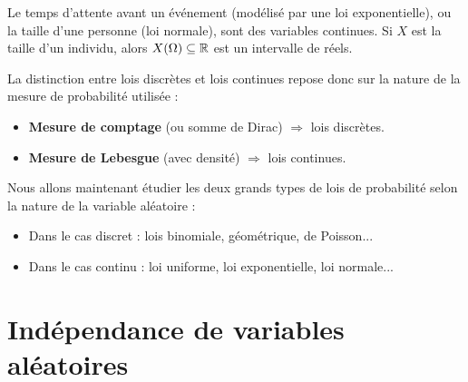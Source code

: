 \begin{example}
    Le temps d'attente avant un événement (modélisé par une loi exponentielle), ou la taille d'une personne (loi normale), 
    sont des variables continues. Si $X$ est la taille d’un individu, alors $X(\Omega) \subseteq \mathbb{R}$ est un intervalle de réels.
\end{example}

\begin{remark}
    La distinction entre lois discrètes et lois continues repose donc sur la nature de la mesure de probabilité utilisée :
    \begin{itemize}
        \item \textbf{Mesure de comptage} (ou somme de Dirac) $\Rightarrow$ lois discrètes.
        \item \textbf{Mesure de Lebesgue} (avec densité) $\Rightarrow$ lois continues.
    \end{itemize}
\end{remark}

Nous allons maintenant étudier les deux grands types de lois de probabilité selon la nature de la variable aléatoire : 

\begin{itemize}
    \item Dans le cas discret : lois binomiale, géométrique, de Poisson...
    \item Dans le cas continu : loi uniforme, loi exponentielle, loi normale...
\end{itemize}




\section{Indépendance de variables aléatoires}


